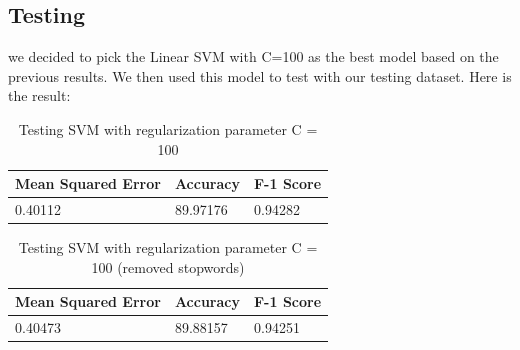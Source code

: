 \documentclass{article}
\begin{document}
\subsection{Testing}
we decided to pick the Linear SVM with C=100 as the best model based on the previous results. We then used this model to test with our testing dataset. Here is the result:

\begin{table}[h]
\centering
\begin{tabular}{lll}
\toprule
\textbf{Mean Squared Error} & \textbf{Accuracy} & \textbf{F-1 Score} \\
\midrule
0.40112 & 89.97176 & 0.94282 \\
\bottomrule
\end{tabular}
\caption{Testing SVM with regularization parameter C = 100}
\label{table:svm_results}
\end{table}

\begin{table}[h]
\centering
\begin{tabular}{lll}
\toprule
\textbf{Mean Squared Error} & \textbf{Accuracy} & \textbf{F-1 Score} \\
\midrule
0.40473 & 89.88157 & 0.94251 \\
\bottomrule
\end{tabular}
\caption{Testing SVM with regularization parameter C = 100 (removed stopwords)}
\label{table:svm_results_removed_stopwords}
\end{table}
\end{document}
